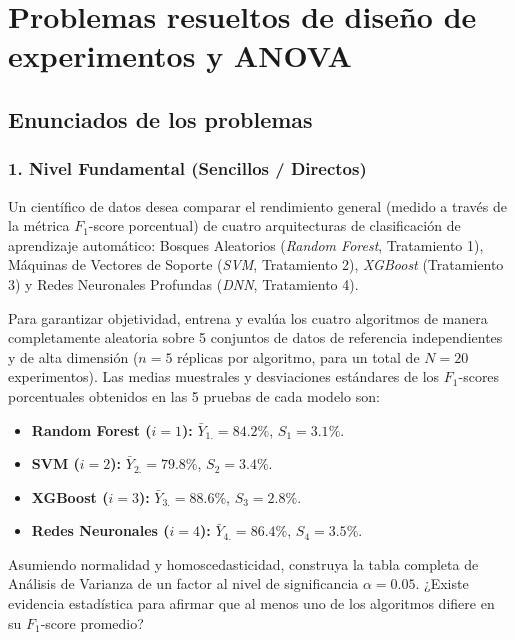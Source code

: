 \section{Problemas resueltos de diseño de experimentos y ANOVA}

\subsection{Enunciados de los problemas}

\subsubsection*{1. Nivel Fundamental (Sencillos / Directos)}

\begin{problema}
	\label{prob:anova_un_factor_ml}
	Un científico de datos desea comparar el rendimiento general (medido a través de la métrica $F_1$-score porcentual) de cuatro arquitecturas de clasificación de aprendizaje automático: Bosques Aleatorios (\emph{Random Forest}, Tratamiento 1), Máquinas de Vectores de Soporte (\emph{SVM}, Tratamiento 2), \emph{XGBoost} (Tratamiento 3) y Redes Neuronales Profundas (\emph{DNN}, Tratamiento 4).
	
	Para garantizar objetividad, entrena y evalúa los cuatro algoritmos de manera completamente aleatoria sobre 5 conjuntos de datos de referencia independientes y de alta dimensión ($n = 5$ réplicas por algoritmo, para un total de $N = 20$ experimentos). Las medias muestrales y desviaciones estándares de los $F_1$-scores porcentuales obtenidos en las 5 pruebas de cada modelo son:
	\begin{itemize}
		\item \textbf{Random Forest ($i=1$):} $\bar{Y}_{1.} = 84.2\%$, $S_1 = 3.1\%$.
		\item \textbf{SVM ($i=2$):} $\bar{Y}_{2.} = 79.8\%$, $S_2 = 3.4\%$.
		\item \textbf{XGBoost ($i=3$):} $\bar{Y}_{3.} = 88.6\%$, $S_3 = 2.8\%$.
		\item \textbf{Redes Neuronales ($i=4$):} $\bar{Y}_{4.} = 86.4\%$, $S_4 = 3.5\%$.
	\end{itemize}
	Asumiendo normalidad y homoscedasticidad, construya la tabla completa de Análisis de Varianza de un factor al nivel de significancia $\alpha = 0.05$. ¿Existe evidencia estadística para afirmar que al menos uno de los algoritmos difiere en su $F_1$-score promedio?
\end{problema}

